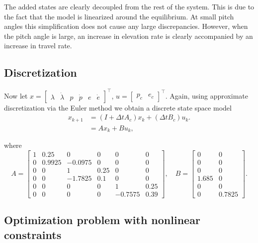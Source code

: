 \label{text:problem4_state_space}
The added states are clearly decoupled from the rest of the system. This is due to the fact that the model is linearized around the equilibrium. At small pitch angles this simplification does not cause any large discrepancies. However, when the pitch angle is large, an increase in elevation rate is clearly accompanied by an increase in travel rate. 

\subsection{Discretization}
Now let $x = \begin{bmatrix}\lambda&\dot{\lambda}&p&\dot{p}&e&\dot{e}\end{bmatrix}^\top$, $u = \begin{bmatrix}p_c&e_c\end{bmatrix}^\top$. Again, using approximate discretization via the Euler method we obtain a discrete state space model
\begin{align}
	\label{eq:ex_dsys}
	x_{k+1} &= (I + \Delta t A_c) x_k + (\Delta t B_c) u_k. \nonumber\\
	&= Ax_k + Bu_k,
\end{align}

where 
\begin{equation*}
	A = 
	\begin{bmatrix}
		1 & 0.25 & 0 & 0 & 0 & 0\\
		0 & 0.9925 & -0.0975 & 0 & 0 & 0\\
		0 & 0 & 1 & 0.25 & 0 & 0\\
		0 & 0 & -1.7825 & 0.1 & 0 & 0\\
		0 & 0 & 0 & 0 & 1 & 0.25\\
		0 & 0 & 0 & 0 & -0.7575 & 0.39
	\end{bmatrix}, \quad
	B = 
	\begin{bmatrix}
		0 & 0\\
		0 & 0\\
		0 & 0\\
		1.685 & 0\\
		0 & 0\\
		0 & 0.7825
	\end{bmatrix}.
\end{equation*}

\subsection{Optimization problem with nonlinear constraints}

